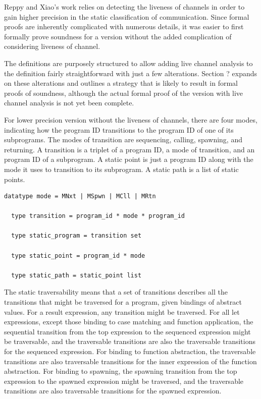 \documentclass{article}
\begin{document}
Reppy and Xiao's work relies on detecting the liveness of channels in order to gain higher
precision in the static classification of communication. Since formal proofs are inherently
complicated with numerous details, it was easier to first formally prove soundness for a
version without the added complication of considering liveness of channel.

The definitions are purposely structured to allow adding live channel analysis to the
definition fairly straightforward with just a few alterations.  Section ? expands on
these alterations and outlines a strategy that is likely to result in formal proofs of
soundness, although the actual formal proof of the version with live channel analysis is
not yet been complete.  

For lower precision version without the liveness of channels, there are four modes,
indicating how the program ID transitions to the program ID of one of
its subprograms.
The modes of transition are sequencing, calling, spawning, and returning. A transition is a
triplet of a program ID, a mode of transition, and an program ID of a
subprogram. A static point is just a program ID along with the mode it uses to
transition to its subprogram. A static path is a list of static points.  

\begin{lstlisting}[language=logic, mathescape]
  datatype mode = MNxt | MSpwn | MCll | MRtn

  type transition = program_id * mode * program_id

  type static_program = transition set

  type static_point = program_id * mode

  type static_path = static_point list
  \end{lstlisting}

The static traversability means that a set of transitions describes all the transitions
that might be traversed for a program, given bindings of abstract values.  For a result
expression, any transition might be traversed.  For all let expressions, except those binding
to case matching and function application, the sequential transition from the top expression to
the sequenced expression might be traversable, and the traversable transitions are also the
traversable transitions for the sequenced expression.  For binding to function abstraction, the
traversable transitions are also traversable transitions for the inner expression of the
function abstraction.  For binding to spawning, the spawning transition from the top expression
to the spawned expression might be traversed, and the traversable transitions are also
traversable transitions for the spawned expression.
\end{document}
